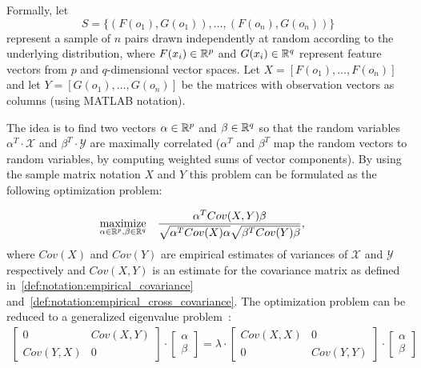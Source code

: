 Formally, let
$$ S = \{ \left( F(o_1), G(o_1) \right), \ldots, \left( F(o_n), G(o_n) \right) \} $$
represent a sample of $n$ pairs drawn independently at random according to the underlying distribution, where $F(x_i) \in \mathbb{R}^p$ and $G(x_i) \in \mathbb{R}^q$ represent feature vectors from $p$ and $q$-dimensional vector spaces. Let $X=[F(o_1), \ldots, F(o_n)]$ and let $Y=[G(o_1), \ldots ,G(o_n)]$ be the matrices with observation vectors as columns (using MATLAB notation).

The idea is to find two vectors $\alpha \in \mathbb{R}^p$ and $\beta \in \mathbb{R}^q$ so that the random variables $\alpha^T \cdot \mathcal{X}$ and $\beta^T \cdot \mathcal{Y}$ are maximally correlated ($\alpha^T$ and $\beta^T$ map the random vectors to random variables, by computing weighted sums of vector components). By using the sample matrix notation $X$ and $Y$ this problem can be formulated as the following optimization problem:

\begin{equation}\label{eq:background:cca:original}
\begin{aligned}
& \underset{\alpha \in \mathbb{R}^{p}, \beta \in \mathbb{R}^{q}}{\text{maximize}}
& & \frac{\alpha^T Cov(X,Y) \beta}{\sqrt{\alpha^T Cov(X) \alpha} \sqrt{\beta^T Cov(Y) \beta}},
\end{aligned}
\end{equation}
where $Cov(X)$ and $Cov(Y)$ are empirical estimates of variances of $\mathcal{X}$ and $\mathcal{Y}$ respectively and $Cov(X,Y)$ is an estimate for the covariance matrix as defined in~\ref{def:notation:empirical_covariance} and~\ref{def:notation:empirical_cross_covariance}.
 The optimization problem can be reduced to a generalized eigenvalue problem~\cite{HardoonCCA}:
\begin{align}\label{eq:background:cca:eigen}
\begin{bmatrix}
    0       & Cov(X,Y) \\
    Cov(Y,X)& 0 
\end{bmatrix}
\cdot
\begin{bmatrix}
    \alpha \\
    \beta
\end{bmatrix}
=
\lambda
\cdot
\begin{bmatrix}
    Cov(X,X) & 0 \\
    0 &  Cov(Y,Y)
\end{bmatrix}
\cdot
\begin{bmatrix}
    \alpha \\
    \beta
\end{bmatrix}
\end{align}

